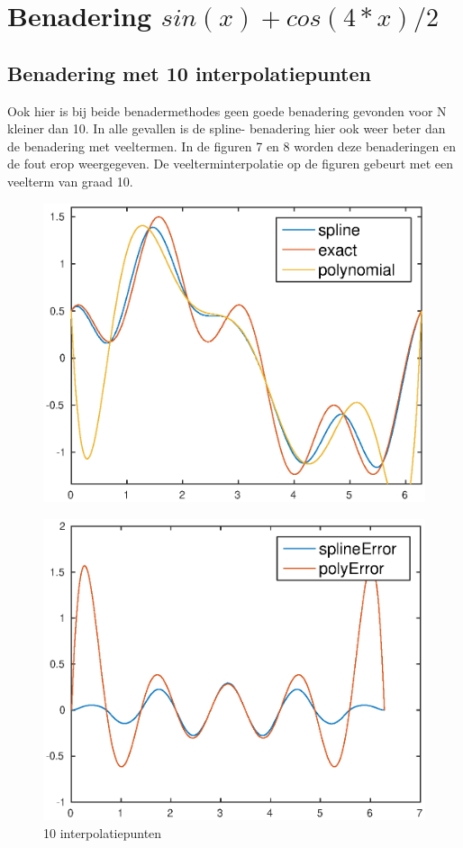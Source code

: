 \documentclass[]{article}
\begin{document}
\section*{Benadering $sin(x) + cos(4*x)/2$}
\subsection*{Benadering met 10 interpolatiepunten}
Ook hier is bij beide benadermethodes geen goede benadering gevonden voor N kleiner dan 10. In alle gevallen is de spline- benadering hier ook weer beter dan de benadering met veeltermen.
In de figuren 7 en 8 worden deze benaderingen en de fout erop weergegeven. De veelterminterpolatie op de figuren gebeurt met een veelterm van graad 10. 
\begin{figure}[H]
\centering
\begin{minipage}{0.5\textwidth}
\centering %
 \includegraphics[width=1\textwidth]{opgave3_N10.eps}
  \label{opgave3_N10.eps}
\caption{10 interpolatiepunten}
\end{minipage}\hfill
\begin{minipage}{0.5\textwidth}
\centering
\includegraphics[width=1\textwidth]{opgave3_N10_error.eps}

\end{minipage}
\end{figure}
\end{document}
